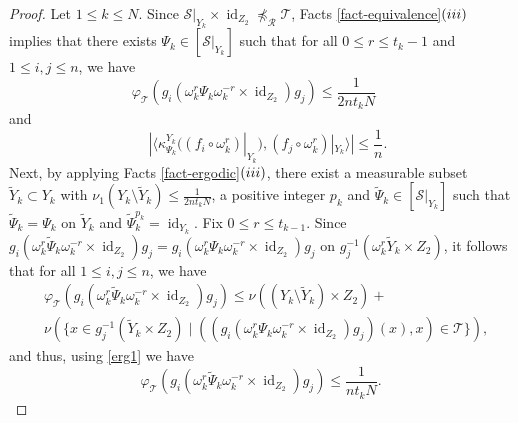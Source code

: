 \documentclass[11pt]{amsart}
\numberwithin{equation}{section}
\theoremstyle{plain}
\theoremstyle{definition}
\newcommand{\id}{\operatorname{id}}
\begin{document}
\begin{proof}
Let $1\leq k\leq N$. Since $\mathscr S|_{Y_k} \times \id_{Z_2} \npreceq_{\mathscr R}  \mathscr T$, Facts \ref{fact-equivalence}$(\rm iii)$ implies that there exists $\Psi_k\in [\mathscr S|_{Y_k}]$ such that for all $0\leq r\leq t_k-1$ and $1\leq i,j\leq n$, we have
\begin{equation}\label{erg1}
\varphi_{\mathscr T}(g_i  (\omega_k^r\Psi_k \omega_k^{-r}\times \id_{Z_2})g_j)\leq \frac{1}{2n t_k N} \quad     
\end{equation}
and 
\begin{equation}\label{erg111}
\quad |\langle \kappa^{Y_k}_{\Psi_k}((f_i\circ \omega_k^r)|_{Y_k}),(f_j\circ\omega_k^r)|_{Y_k}  \rangle|\leq \frac{1}{n}. 
\end{equation}
Next, by applying Facts \ref{fact-ergodic}$(\rm iii)$, there exist a measurable subset $\tilde Y_k\subset Y_k$ with $\nu_1(Y_k\setminus \tilde Y_k)\leq \frac{1}{2n t_k N}$, a positive integer $p_k$ and $\tilde\Psi_k\in [\mathscr S|_{Y_k}]$ such that $\tilde \Psi_k=\Psi_k$ on $\tilde Y_k$ and $\tilde \Psi_k^{p_k}=\id_{Y_k}$. Fix $0\leq r\leq t_{k-1}$. Since $g_i (\omega_k^r\tilde\Psi_k \omega_k^{-r}\times \id_{Z_2})g_j=g_i (\omega_k^r\Psi_k \omega_k^{-r}\times \id_{Z_2} )g_j$ on $g_j^{-1} (\omega_k^r \tilde Y_k\times Z_2)$, it follows that for all  $1\leq i,j\leq n$, we have
\begin{align*}
& \varphi_{\mathscr T}(g_i (\omega_k^r\tilde\Psi_k \omega_k^{-r} \times \id_{Z_2}) g_j) \leq \nu((Y_k\setminus \tilde Y_k)\times Z_2)+\\ 
& \nu(\{ x \in g_j^{-1} (\tilde Y_k \times Z_2)\mid  ((g_i (\omega_k^r\Psi_k \omega_k^{-r}\times \id_{Z_2}) g_j)(x),x) \in \mathscr T \}),
\end{align*}
and thus, using \eqref{erg1} we have
\begin{equation}\label{erg112}
 \varphi_{\mathscr T}(g_i (\omega_k^r\tilde\Psi_k \omega_k^{-r} \times \id_{Z_2}) g_j)\leq\frac{1}{nt_kN}.
\end{equation}


\end{proof}
\end{document}
